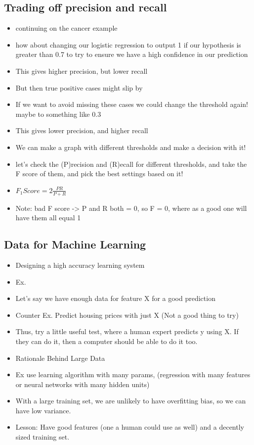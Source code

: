 \documentclass[]{article}
\begin{document}
	\subsection{Trading off precision and recall}
		\begin{itemize}
			\item continuing on the cancer example
			\item how about changing our logistic regression to output 1 if our hypothesis is greater than 0.7 to try to ensure we have a high confidence in our prediction
			\item This gives higher precision, but lower recall
			\item But then true positive cases might slip by
			\item If we want to avoid missing these cases we could change the threshold again! maybe to something like 0.3
			\item This gives lower precision, and higher recall
			\item We can make a graph with different thresholds and make a decision with it!
			\item let's check the (P)recision and (R)ecall for different thresholds, and take the F score of them, and pick the best settings based on it!
			\item $F_1 Score = 2\frac{PR}{P+R}$
			\item Note: bad F score -> P and R both = 0, so F = 0, where as a good one will have them all equal 1
		\end{itemize}
		
	\subsection{Data for Machine Learning}
		\begin{itemize}
			\item Designing a high accuracy learning system
			\item Ex.
			\item Let's say we have enough data for feature X for a good prediction
			\item Counter Ex. Predict housing prices with just X (Not a good thing to try)
			\item Thus, try a little useful test, where a human expert predicts y using X. If they can do it, then a computer should be able to do it too.
			\item Rationale Behind Large Data
			\item Ex use learning algorithm  with many params, (regression with many features or neural networks with many hidden units)
			\item With a large training set, we are unlikely to have overfitting bias, so we can have low variance.
			\item Lesson: Have good features (one a human could use as well) and a decently sized training set.
		\end{itemize}
	
\end{document}
